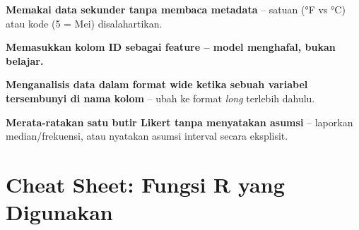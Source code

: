 \documentclass[
  indonesian,
  letterpaper,
]{book}
\begin{document}
\textbf{Memakai data sekunder tanpa membaca metadata} -- satuan (°F vs
°C) atau kode (5 = Mei) disalahartikan.

\textbf{Memasukkan kolom ID sebagai feature -- model menghafal, bukan
belajar.}

\textbf{Menganalisis data dalam format wide ketika sebuah variabel
tersembunyi di nama kolom} -- ubah ke format \emph{long} terlebih
dahulu.

\textbf{Merata-ratakan satu butir Likert tanpa menyatakan asumsi} --
laporkan median/frekuensi, atau nyatakan asumsi interval secara
eksplisit.

\section{Cheat Sheet: Fungsi R yang
Digunakan}\label{cheat-sheet-fungsi-r-yang-digunakan-1}
\end{document}
